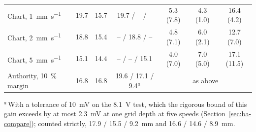 \begin{table}[!tbp]
\begin{tabular}{@{}lcccccc@{}}
    Chart, \SI{1}{\milli\metre\per\second} & 19.7 & 15.7 & 19.7 / -- / -- & 5.3 (7.8) & 4.3 (1.0) & 16.4 (4.2)\\
    Chart, \SI{2}{\milli\metre\per\second} & 18.8 & 15.4 & -- / 18.8 / -- & 4.8 (7.1) & 6.0 (2.1) & 12.7 (7.0)\\
    Chart, \SI{5}{\milli\metre\per\second} & 15.1 & 14.4 & -- / -- / 15.1 & 4.0 (7.0) & 7.0 (5.0) & 17.1 (11.5)\\
    Authority, \SI{10}{\percent} margin & 16.8 & 16.8 & 19.6 / 17.1 / 9.4$^{a}$ & \multicolumn{3}{c}{as above}\\
    \bottomrule
  \end{tabular}

  \smallskip
  \parbox{0.95\textwidth}{\footnotesize $^{a}$\,With a tolerance of \SI{10}{\milli\volt} on the \SI{8.1}{\volt} test, which the rigorous bound of this gain exceeds by at most \SI{2.3}{\milli\volt} at one grid depth at five speeds (Section~\ref{sec:ba-compare}); counted strictly, 17.9 / 15.5 / \SI{9.2}{\milli\metre} and 16.6 / 14.6 / \SI{8.9}{\milli\metre}.}
\end{table}

